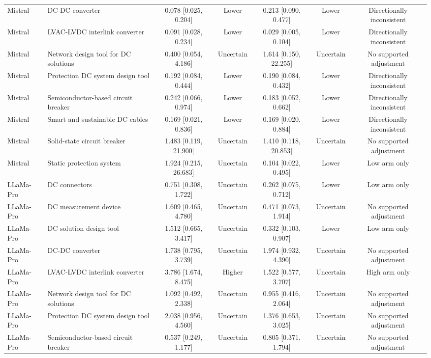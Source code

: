 \begin{landscape}
\begin{longtable}{llccccc}
Mistral & DC-DC converter & 0.078 [0.025, 0.204] & Lower & 0.213 [0.090, 0.477] & Lower & Directionally inconsistent \\
Mistral & LVAC-LVDC interlink converter & 0.091 [0.028, 0.234] & Lower & 0.029 [0.005, 0.104] & Lower & Directionally inconsistent \\
Mistral & Network design tool for DC solutions & 0.400 [0.054, 4.186] & Uncertain & 1.614 [0.150, 22.255] & Uncertain & No supported adjustment \\
Mistral & Protection DC system design tool & 0.192 [0.084, 0.444] & Lower & 0.190 [0.084, 0.432] & Lower & Directionally inconsistent \\
Mistral & Semiconductor-based circuit breaker & 0.242 [0.066, 0.974] & Lower & 0.183 [0.052, 0.662] & Lower & Directionally inconsistent \\
Mistral & Smart and sustainable DC cables & 0.169 [0.021, 0.836] & Lower & 0.169 [0.020, 0.884] & Lower & Directionally inconsistent \\
Mistral & Solid-state circuit breaker & 1.483 [0.119, 21.900] & Uncertain & 1.410 [0.118, 20.853] & Uncertain & No supported adjustment \\
Mistral & Static protection system & 1.924 [0.215, 26.683] & Uncertain & 0.104 [0.022, 0.495] & Lower & Low arm only \\
LLaMa-Pro & DC connectors & 0.751 [0.308, 1.722] & Uncertain & 0.262 [0.075, 0.712] & Lower & Low arm only \\
LLaMa-Pro & DC measurement device & 1.609 [0.465, 4.780] & Uncertain & 0.471 [0.073, 1.914] & Uncertain & No supported adjustment \\
LLaMa-Pro & DC solution design tool & 1.512 [0.665, 3.417] & Uncertain & 0.332 [0.103, 0.907] & Lower & Low arm only \\
LLaMa-Pro & DC-DC converter & 1.738 [0.795, 3.739] & Uncertain & 1.974 [0.932, 4.390] & Uncertain & No supported adjustment \\
LLaMa-Pro & LVAC-LVDC interlink converter & 3.786 [1.674, 8.475] & Higher & 1.522 [0.577, 3.707] & Uncertain & High arm only \\
LLaMa-Pro & Network design tool for DC solutions & 1.092 [0.492, 2.338] & Uncertain & 0.955 [0.416, 2.064] & Uncertain & No supported adjustment \\
LLaMa-Pro & Protection DC system design tool & 2.038 [0.956, 4.560] & Uncertain & 1.376 [0.653, 3.025] & Uncertain & No supported adjustment \\
LLaMa-Pro & Semiconductor-based circuit breaker & 0.537 [0.249, 1.177] & Uncertain & 0.805 [0.371, 1.794] & Uncertain & No supported adjustment \\

\end{longtable}
\end{landscape}
